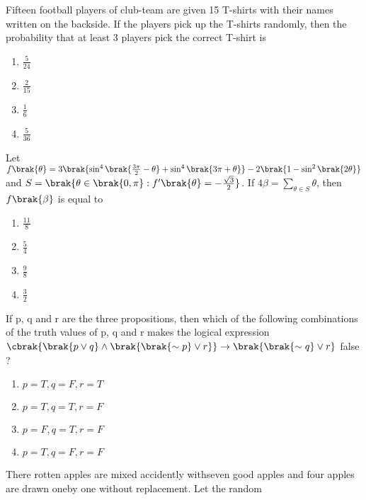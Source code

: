 \iffalse
\title{2023}   
\author{AI24Btech11024}
\section{mcq-single}              
\fi
\item Fifteen football players of club-team are given 15 T-shirts with their names written on the backside. If the players pick up the T-shirts randomly, then the probability that at least 3 players pick the correct T-shirt is \hfill{}
\begin{enumerate} 
    \item $\frac{5}{24}$
    \item $\frac{2}{15}$
    \item $\frac{1}{6}$
    \item $\frac{5}{36}$
\end{enumerate}
\item Let \\$f\brak{\theta} = 3 \brak{ \sin^{4}\brak{ \frac{3\pi}{2} - \theta } + \sin^{4}\brak{ 3\pi + \theta } } - 2 \brak{ 1 - \sin^{2}\brak{2\theta} }$
\\and $S= \brak{ \theta \in \brak{0, \pi} : f'\brak{\theta} = -\frac{\sqrt{3}}{2} }$. If $ 4\beta = \sum_{\theta \in S} \theta $, then $ f\brak{\beta} $ is equal to \hfill{}
\begin{enumerate}
    \item $\frac{11}{8}$
    \item $\frac{5}{4}$
    \item $\frac{9}{8}$
    \item $\frac{3}{2}$
\end{enumerate}
\item If p, q and r are the three propositions, then which of the following combinations of the truth values of p, q and r makes the logical expression 
$\cbrak{\brak{p \lor q}\land \brak{\brak{\sim p}\lor r}} \to \brak{\brak{\sim q} \lor r}$ false ? \hfill{}
\begin{enumerate}
    \item $p=T,q=F,r=T$
    \item $p=T,q=T,r=F$
    \item $p=F,q=T,r=F$
    \item $p=T,q=F,r=F$
\end{enumerate}
\item There rotten apples are mixed accidently withseven good apples and four apples are drawn oneby one without replacement. Let the random
